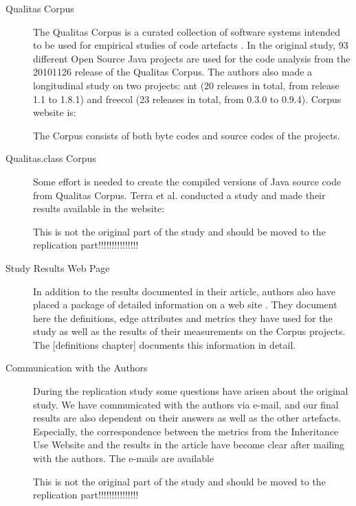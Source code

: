 \documentclass{uvamscse}
\begin{document}
\begin{description}

\item[Qualitas Corpus] 
The Qualitas Corpus is a curated collection of software systems intended to be used for empirical studies of code artefacts \cite{QualitasCorpus:APSEC:2010}. In the original study, 93 different Open Source Java projects are used for the code analysis from the 20101126 release of the Qualitas Corpus. The authors also made a longitudinal study on two projects: ant (20 releases in total, from release 1.1 to 1.8.1) and freecol (23 releases in total, from 0.3.0 to 0.9.4). Corpus website is: \cite{QualitasCorpusWeb}

The Corpus consists of both byte codes and source codes of the projects.

\item[Qualitas.class Corpus]
Some effort is needed to create the compiled versions of Java source code from Qualitas Corpus. Terra et al. conducted a study \cite{qualitas.class} and made their results available in the website: \cite{qualitas.classCorpusWeb}

This is not the original part of the study and should be moved to the replication part!!!!!!!!!!!!!!!


\item[Study Results Web Page]
In addition to the results documented in their article, authors also have placed a package of detailed information on a web site \cite{InheritanceUseWeb}. They document here the definitions, edge attributes and metrics they have used for the study as well as the results of their measurements on the Corpus projects. The [definitions chapter] documents this information in detail.

\item[Communication with the Authors] 
During the replication study some questions have arisen about the original study. We have communicated with the authors via e-mail, and our final results are also dependent on their answers as well as the other artefacts. Especially, the correspondence between the metrics from the Inheritance Use Website \cite{InheritanceUseWeb} and the results in the article \cite{QualitasCorpus:APSEC:2010} have become clear after mailing with the authors. The e-mails are available  

This is not the original part of the study and should be moved to the replication part!!!!!!!!!!!!!!!


\end{description}
\end{document}
